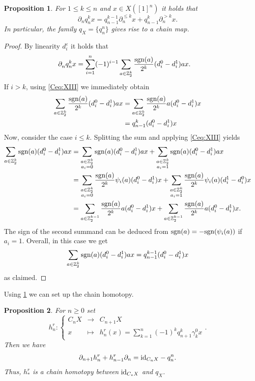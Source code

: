 \documentclass[12pt]{amsart}
\theoremstyle{plain}
\numberwithin{lemma}{\DefaultNumberTheoremWithin}
\numberwithin{claim}{\DefaultNumberTheoremWithin}
\numberwithin{theorem}{\DefaultNumberTheoremWithin}
\numberwithin{corollary}{\DefaultNumberTheoremWithin}
\newtheorem{proposition}{Proposition}
\numberwithin{proposition}{\DefaultNumberTheoremWithin}
\numberwithin{conjecture}{\DefaultNumberTheoremWithin}
\theoremstyle{definition}
\theoremstyle{definition}
\numberwithin{question}{\DefaultNumberTheoremWithin}
\theoremstyle{definition}
\numberwithin{problem}{\DefaultNumberTheoremWithin}
\theoremstyle{remark}
\numberwithin{remark}{\DefaultNumberTheoremWithin}
\theoremstyle{remark}
\numberwithin{example}{\DefaultNumberTheoremWithin}
\def\blt{*}
\def\ve{\varepsilon}
\def\id{\textnormal{id}}
\def\sgn{\textnormal{sgn}}
\def\ZZ{\mathbb Z}
\def\pirev{q}
\def\revtowermap{\psi}
\def\Connection{\gamma}
\newcommand{\del}{\partial}
\newcommand{\argdelkub}[2]{\del^{#1}_{#2}}
\newcommand{\prev}[2]{q_{#2}^{#1}}
\newcommand{\hrev}[1]{h^r_{#1}}
\begin{document}
\begin{proposition} \label{prop:useful}
    For $1\leq k\leq n$ and $x\in X([1]^n)$ it holds that
    \[
    \argdelkub{}{n} \prev{k}{n}x= \prev{k-1}{n-1}\argdelkub{\leq k}{n}x + \prev{k}{n-1}\argdelkub{>k}{n}x.
    \]
    In particular, the family $\pirev_X = \{\prev{n}{n}\}$ gives rise to a chain map.
\end{proposition}
\begin{proof}
By linearity $d_i^\ve$ it holds that    
    \begin{align*}
    \argdelkub{}{n} \prev{k}{n}x
    &=\sum_{i=1}^{n}(-1)^{i-1}\sum_{a\in\ZZ_2^k}\frac{\sgn(a)}{2^k} (d_i^0-d_i^1)ax.
    \end{align*}
    If $i>k$, using \eqref{Ceq:XIII} we immediately obtain
    \begin{align*}
        \sum_{a\in\ZZ_2^k}\frac{\sgn(a)}{2^k} (d_i^0-d_i^1)ax&=\sum_{a\in\ZZ_2^k}\frac{\sgn(a)}{2^k} a(d_i^0-d_i^1)x\\
        &=\prev{k}{n-1}(d_i^0-d_i^1)x
    \end{align*}
    Now, consider the case $i\leq k$. Splitting the sum and applying \eqref{Ceq:XIII} yields
    \begin{align*}
        \sum_{a\in\ZZ_2^k}\sgn(a) (d_i^0-d_i^1)ax&=\sum_{\substack{a\in\ZZ_2^k\\a_i=0}}\sgn(a) (d_i^0-d_i^1)ax+\sum_{\substack{a\in\ZZ_2^k\\a_i=1}}\sgn(a) (d_i^0-d_i^1)ax\\
        &=\sum_{\substack{a\in\ZZ_2^k\\a_i=0}}\frac{\sgn(a)}{2^k} \revtowermap_i(a)(d_i^0-d_i^1)x+\sum_{\substack{a\in\ZZ_2^k\\a_i=1}}\frac{\sgn(a)}{2^k} \revtowermap_i(a)(d_i^1-d_i^0)x\\
        &=\sum_{a\in\ZZ_2^{k-1}}\frac{\sgn(a)}{2^k} a(d_i^0-d_i^1)x+\sum_{a\in\ZZ_2^{k-1}}\frac{\sgn(a)}{2^k} a(d_i^0-d_i^1)x.
    \end{align*}
    The sign of the second summand can be deduced  from  $\sgn(a)=-\sgn(\revtowermap_i(a))$ if $a_i=1$. Overall, in this case we get 
    \[
    \sum_{a\in\ZZ_2^k}\sgn(a) (d_i^0-d_i^1)ax=\prev{k-1}{n-1}(d_i^0-d_i^1)x
    \]
    as claimed.
    \end{proof}

 Using \ref{prop:useful}
 we can set up the chain homotopy.
  \begin{proposition}\label{PropRevChainHtpy}
    For $n \geq 0$ set
    $$\hrev{n} \colon \left\{ \begin{array}{ccc} C_nX & \rightarrow & 
    C_{n+1} X \\ x & \mapsto &\hrev{n}(x)=\displaystyle{\sum_{k=1}^n(-1)^k \prev{k}{n+1}\Connection_k^0x}\end{array} \right. . $$
    Then we have
    $$\del_{n+1} \hrev{n} + \hrev{n-1}\del_n = \id_{C_nX} - \prev{n}{n}.$$
    Thus, $\hrev{\blt}$ is a chain homotopy between
    $\id_{C_\blt X}$ and $\pirev_X$.
\end{proposition}
\end{document}
